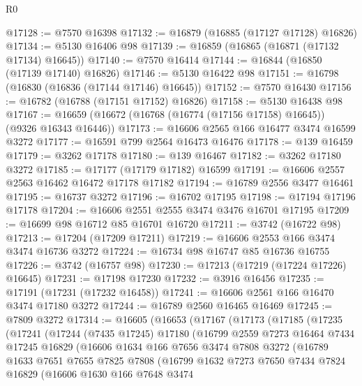 \begin{lexlean}{R0}
\begin{coremodule}
@17128 := @7570 @16398
@17132 := @16879 (@16885 (@17127 @17128) @16826)
@17134 := @5130 @16406 @98
@17139 := @16859 (@16865 (@16871 (@17132 @17134) @16645))
@17140 := @7570 @16414
@17144 := @16844 (@16850 (@17139 @17140) @16826)
@17146 := @5130 @16422 @98
@17151 := @16798 (@16830 (@16836 (@17144 @17146) @16645))
@17152 := @7570 @16430
@17156 := @16782 (@16788 (@17151 @17152) @16826)
@17158 := @5130 @16438 @98
@17167 := @16659 (@16672 (@16768 (@16774 (@17156 @17158) @16645)) (@9326 @16343 @16446))
@17173 := @16606 @2565 @166 @16477 @3474 @16599 @3272
@17177 := @16591 @799 @2564 @16473 @16476
@17178 := @139 @16459
@17179 := @3262 @17178
@17180 := @139 @16467
@17182 := @3262 @17180 @3272
@17185 := @17177 (@17179 @17182) @16599
@17191 := @16606 @2557 @2563 @16462 @16472 @17178 @17182
@17194 := @16789 @2556 @3477 @16461
@17195 := @16737 @3272
@17196 := @16702 @17195
@17198 := @17194 @17196 @17178
@17204 := @16606 @2551 @2555 @3474 @3476 @16701 @17195
@17209 := @16699 @98 @16712 @85 @16701 @16720
@17211 := @3742 (@16722 @98)
@17213 := @17204 (@17209 @17211)
@17219 := @16606 @2553 @166 @3474 @3474 @16736 @3272
@17224 := @16734 @98 @16747 @85 @16736 @16755
@17226 := @3742 (@16757 @98)
@17230 := @17213 (@17219 (@17224 @17226) @16645)
@17231 := @17198 @17230
@17232 := @3916 @16456
@17235 := @17191 (@17231 (@17232 @16458))
@17241 := @16606 @2561 @166 @16470 @3474 @17180 @3272
@17244 := @16789 @2560 @16465 @16469
@17245 := @7809 @3272
@17314 := @16605
    (@16653
      (@17167
        (@17173
          (@17185
            (@17235
              (@17241
                (@17244
                  (@7435 @17245)
                  @17180
                  (@16799
                    @2559
                    @7273
                    @16464
                    @7434
                    @17245
                    @16829
                    (@16606
                      @1634
                      @166
                      @7656
                      @3474
                      @7808
                      @3272
                      (@16789
                        @1633
                        @7651
                        @7655
                        @7825
                        @7808
                        (@16799
                          @1632
                          @7273
                          @7650
                          @7434
                          @7824
                          @16829
                          (@16606
                            @1630
                            @166
                            @7648
                            @3474

\end{coremodule}
\end{lexlean}
